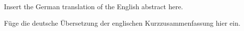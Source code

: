 
Insert the German translation of the English abstract here.

Füge die deutsche Übersetzung der englischen Kurzzusammenfassung hier ein.

